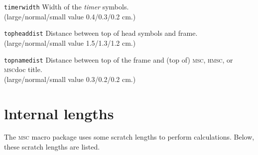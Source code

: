 \documentclass[a4paper]{article}
\newcommand{\cmd}[1]{\texttt{\bslash #1}}
\newcommand{\acro}[1]{{\scshape\lowercase{#1}}}
\newcommand\MSC{\acro{MSC}}
\newcommand\HMSC{\acro{HMSC}}
\newcommand{\MSCdoc}{\MSC{}doc}
\newcommand{\mscpack}{\MSC{} macro package}
\newcommand{\lnsvalue}[3]{large/normal/small value #1/#2/#3}
\newenvironment{defs}{%
  \begin{list}{}%
              {\setlength{\labelwidth}{0pt}%
               \setlength{\labelsep}{1em}%
               \setlength{\leftmargin}{1em}%
               \setlength{\parsep}{1ex}%
               \setlength{\listparindent}{0pt}%
               \setlength{\rightmargin}{0pt}%
               \renewcommand{\makelabel}[1]{##1}%
               \raggedright%
              }%
  }{%
  \end{list}}
\begin{document}
\begin{defs}
\item[\cmd{timerwidth}]
Width of the \emph{timer} symbols.\\
(\lnsvalue{0.4}{0.3}{0.2} cm.)

\item[\cmd{topheaddist}]
Distance between top of head symbols and frame.\\
(\lnsvalue{1.5}{1.3}{1.2} cm.)

\item[\cmd{topnamedist}] Distance between top of the frame and
(top of) \MSC, \HMSC, or \MSCdoc{} title.\\
(\lnsvalue{0.3}{0.2}{0.2} cm.)

\end{defs}


\section{lnternal lengths}

The \mscpack{} uses some scratch lengths to perform
calculations. Below, these scratch lengths are listed.
\end{document}
